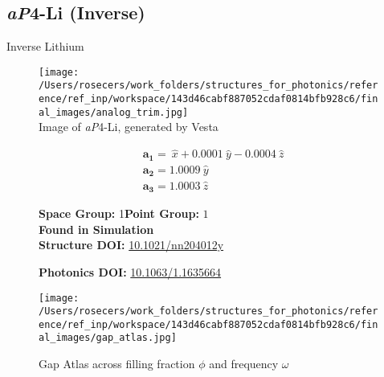 \subsection{\large{\textit{aP}4-Li (Inverse)}}\vspace{-0.1in}
Inverse Lithium


\begin{figure}[H]
\begin{minipage}{0.34\textwidth}\centering
\texttt{[image: /Users/rosecers/work\_folders/structures\_for\_photonics/reference/ref\_inp/workspace/143d46cabf887052cdaf0814bfb928c6/final\_images/analog\_trim.jpg]}\\
\small{Image of \textit{aP}4-Li, generated by Vesta}
\end{minipage}\hfill
\begin{minipage}{0.65\textwidth}\raggedright
{\setlength{\mathindent}{0cm}
\begin{equation*}
\begin{split}&\boldsymbol{a_1} = \ \hat{x} + 0.0001\ \hat{y} - 0.0004\ \hat{z}\\[-8pt]
&\boldsymbol{a_2} = 1.0009\ \hat{y}\\[-8pt]
&\boldsymbol{a_3} = 1.0003\ \hat{z}
\end{split}
\end{equation*}}

\textbf{Space Group:}	1\hspace{0.5in}\textbf{Point Group:}	$1$\\
\textbf{Found in Simulation}\\
\textbf{Structure DOI: }\url{10.1021/nn204012y}

\textbf{Photonics DOI: }\url{10.1063/1.1635664}
\end{minipage}\hfill
\end{figure}
\vspace{-0.25in}


\begin{figure}[H]
\begin{minipage}{0.9\textwidth}\centering
\texttt{[image: /Users/rosecers/work\_folders/structures\_for\_photonics/reference/ref\_inp/workspace/143d46cabf887052cdaf0814bfb928c6/final\_images/gap\_atlas.jpg]}
\\
\end{minipage}\hfill\caption{Gap Atlas across filling fraction $\phi$ and frequency $\omega$}
\end{figure}


